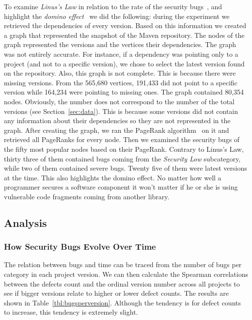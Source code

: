 \documentclass[conference]{llncs}
\begin{document}
To examine {\it Linus's Law} in relation to the rate of the
security bugs~\cite{MW10}, and highlight the
{\it domino effect}~\cite{TH04} we did the
following: during the experiment we retrieved the
dependencies of every version. Based on this information we created a graph
that represented the snapshot of the Maven repository. The
nodes of the graph represented the versions and the vertices their dependencies.
The graph was not entirely accurate. For instance, if
a dependency was pointing only to a project (and not to a specific version), we chose to
select the latest version found on the repository. Also, this graph is not
complete. This is because there were missing versions.
From the 565,680 vertices, 191,433
did not point to a specific version while 164,234 were pointing to missing ones.
The graph contained 80,354 nodes. Obviously, the number does not correspond to
the number of the total versions (see Section~\ref{sec:data}). This is because
some versions did not contain any information about their dependencies so they
are not represented in the graph. After creating the graph, we ran the PageRank
algorithm~\cite{BP98} on it and retrieved all PageRanks for every node. Then we
examined the security bugs of the fifty most popular nodes based on their PageRank.
Contrary to Linus's Law, thirty three of them contained bugs coming from the
{\it Security Low} subcategory, while two of them contained severe bugs.
Twenty five of them were latest versions at the time. This also highlights
the domino effect. No matter how well a programmer secures a software component
it won't matter if he or she is using vulnerable code fragments coming
from another library.

\subsection{Analysis}
\label{sec:analysis}

\subsubsection{How Security Bugs Evolve Over Time}

The relation between bugs and time can be traced from the number of
bugs per category in each project version. We can then calculate the
Spearman correlations between the defects count and the ordinal
version number across all projects to see if bigger versions relate to
higher or lower defect counts. The results are shown in
Table~\ref{tbl:bugsperversion}. Although the tendency is for defect
counts to increase, this tendency is extremely slight.
\end{document}

